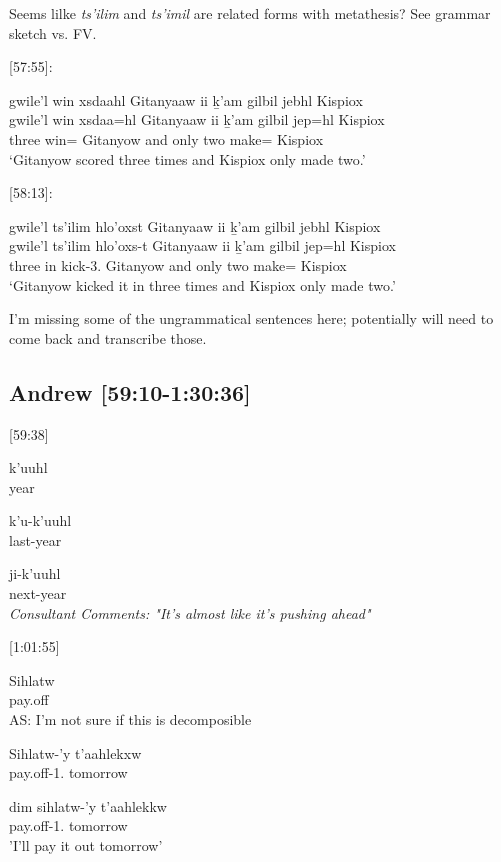 Seems lilke \textit{ts'ilim} and \textit{ts'imil} are related forms with metathesis? See grammar sketch vs. FV.

[57:55]:
\begin{exe}
\ex \glll
gwile'l win xsdaahl Gitanyaaw ii ḵ'am gilbil jebhl Kispiox \\
gwile'l win xsdaa=hl Gitanyaaw ii ḵ'am gilbil jep=hl Kispiox \\
three \Comp{} win=\Cn{} Gitanyow and only two make=\Cn{} Kispiox \\
\glt `Gitanyow scored three times and Kispiox only made two.'
\end{exe}

[58:13]: 
\begin{exe}
\ex \glll
gwile'l ts'ilim hlo'oxst Gitanyaaw ii ḵ'am gilbil jebhl Kispiox \\
gwile'l ts'ilim hlo'oxs-t Gitanyaaw ii ḵ'am gilbil jep=hl Kispiox \\
three in kick-3.\Ii{} Gitanyow and only two make=\Cn{} Kispiox \\
\glt `Gitanyow kicked it in three times and Kispiox only made two.'
\end{exe}

I'm missing some of the ungrammatical sentences here; potentially will need to come back and transcribe those.

\subsection{Andrew [59:10-1:30:36]}

[59:38]
\begin{exe}
\ex \begin{xlist}
\item \gll k'uuhl\\
year\\
\item \gll k'u-k'uuhl\\
last-year\\
\item \gll ji-k'uuhl\\
next-year\\
\textit{Consultant Comments: "It's almost like it's pushing ahead"}
\end{xlist} 
\end{exe}

[1:01:55]
\begin{exe}
\ex \begin{xlist}
\item \gll Sihlatw\\
pay.off\\
AS: I'm not sure if this is decomposible
\item \gll Sihlatw-'y t'aahlekxw\\
pay.off-1.\Ii{} tomorrow\\
\item \gll dim sihlatw-'y t'aahlekkw\\
\Fut{} pay.off-1.\Ii{} tomorrow\\
'I'll pay it out tomorrow'
\end{xlist}
\end{exe}


